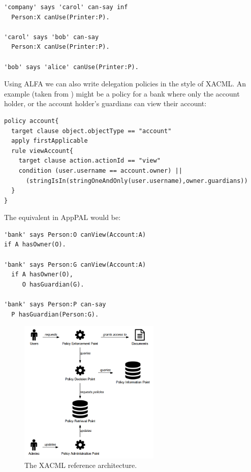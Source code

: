\documentclass[thesis.tex]{subfiles}
\begin{document}
\begin{lstlisting}
'company' says 'carol' can-say inf
  Person:X canUse(Printer:P).

'carol' says 'bob' can-say
  Person:X canUse(Printer:P).

'bob' says 'alice' canUse(Printer:P).
\end{lstlisting}

Using ALFA we can also write delegation policies in the style of
XACML.  An example (taken from \cite{axiomatics_going_2016}) might be
a policy for a bank where only the account holder, or the account
holder's guardians can view their account:

\begin{lstlisting}
policy account{ 
  target clause object.objectType == "account"
  apply firstApplicable
  rule viewAccount{ 
    target clause action.actionId == "view"
    condition (user.username == account.owner) ||
      (stringIsIn(stringOneAndOnly(user.username),owner.guardians))
  }
}
\end{lstlisting}

The equivalent in AppPAL would be:

\begin{lstlisting}
'bank' says Person:O canView(Account:A)
if A hasOwner(O).

'bank' says Person:G canView(Account:A)
  if A hasOwner(O),
     O hasGuardian(G).

'bank' says Person:P can-say
  P hasGuardian(Person:G).
\end{lstlisting}

\begin{figure}
  \centering
  \includegraphics[width=0.6\textwidth]{figures/xacml-architecture.png}
  \caption{The XACML reference architecture.}
  \label{fig:xacml-architecture}
\end{figure}
\end{document}
